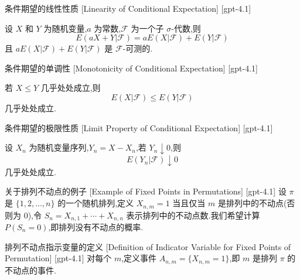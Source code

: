 \documentclass[UTF8]{ctexart}
\begin{document}
    
    
    \begin{thm}
        {条件期望的线性性质}
        [Linearity of Conditional Expectation]
        [gpt-4.1]
        
设 $X$ 和 $Y$ 为随机变量,$a$ 为常数,$\mathcal{F}$ 为一个子 $\sigma$-代数,则
\[
E(aX + Y | \mathcal{F}) = a E(X | \mathcal{F}) + E(Y | \mathcal{F})
\]
且 $a E(X | \mathcal{F}) + E(Y | \mathcal{F})$ 是 $\mathcal{F}$-可测的.

    \end{thm}
    
    
    
    \begin{thm}
        {条件期望的单调性}
        [Monotonicity of Conditional Expectation]
        [gpt-4.1]
        
若 $X \leq Y$ 几乎处处成立,则
\[
E(X | \mathcal{F}) \leq E(Y | \mathcal{F})
\]
几乎处处成立.

    \end{thm}
    
    
    
    \begin{thm}
        {条件期望的极限性质}
        [Limit Property of Conditional Expectation]
        [gpt-4.1]
        
设 $X_n$ 为随机变量序列,$Y_n = X - X_n$,若 $Y_n \downarrow 0$,则
\[
E(Y_n | \mathcal{F}) \downarrow 0
\]
几乎处处成立.

    \end{thm}
    
    
    
    \begin{xmp}
        {关于排列不动点的例子}
        [Example of Fixed Points in Permutations]
        [gpt-4.1]
        设 $\pi$ 是 $\{1, 2, \ldots, n\}$ 的一个随机排列,定义 $X_{n, m} = 1$ 当且仅当 $m$ 是排列中的不动点(否则为 0),令 $S_n = X_{n, 1} + \cdots + X_{n, n}$ 表示排列中的不动点数.我们希望计算 $P(S_n = 0)$,即排列没有不动点的概率.
    \end{xmp}
    
    
    
    \begin{dfn}
        {排列不动点指示变量的定义}
        [Definition of Indicator Variable for Fixed Points of Permutation]
        [gpt-4.1]
        对每个 $m$,定义事件 $A_{n, m} = \{ X_{n, m} = 1 \}$,即 $m$ 是排列 $\pi$ 的不动点的事件.
    \end{dfn}
    
\end{document}
